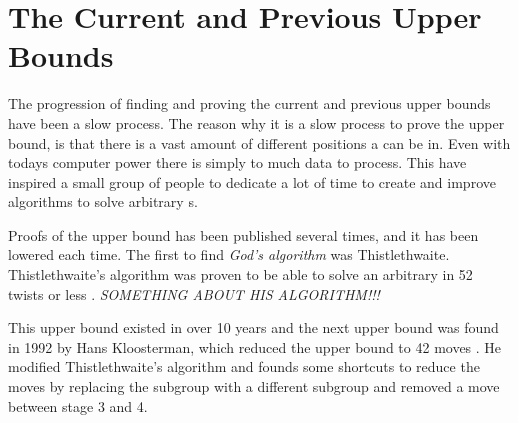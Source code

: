 \section{The Current and Previous Upper Bounds}
The progression of finding and proving the current and previous upper bounds have been a slow process.
The reason why it is a slow process to prove the upper bound, is that there is a vast amount of different positions a \rubik{} can be in. Even with todays computer power there is simply to much data to process. This have inspired a small group of people to dedicate a lot of time to create and improve algorithms to solve arbitrary \rubik{}s.

\begin{comment}

The set solver created by Thomas Rockicki, which was described in the previous section will now be further described.


The set solver has a special way of testing the \rubik{}s. It does not solve them to the unit position $e$, instead it finds a move sequence for a subgroup of the \rubik{} this way it can solve approximately 19.5 billion cubes at a time and not just one. The reason for this is that if you relabel an arbitrary cube, that given cube can be unlabeled to approximately 19.5 billion different cube positions. Recall that there are approximately 19.5 billion positions in the set \m{H} and all these positions are equal to $e$ when relabeled. The same logic applies to any other given position.
\end{comment}

Proofs of the upper bound has been published several times, and it has been lowered each time.
The first to find \textit{God's algorithm} was Thistlethwaite. Thistlethwaite's algorithm was proven to be able to solve an arbitrary \rubik{} in 52 twists or less \cite{jaapthistle}.
\emph{SOMETHING ABOUT HIS ALGORITHM!!!}

This upper bound existed in over 10 years and the next upper bound was found in 1992 by Hans Kloosterman, which reduced the upper bound to 42 moves \cite[p. 44]{rokickipdf}. 
He modified Thistlethwaite's algorithm and founds some shortcuts to reduce the moves by replacing the  subgroup with a different subgroup and removed a move between stage 3 and 4.

